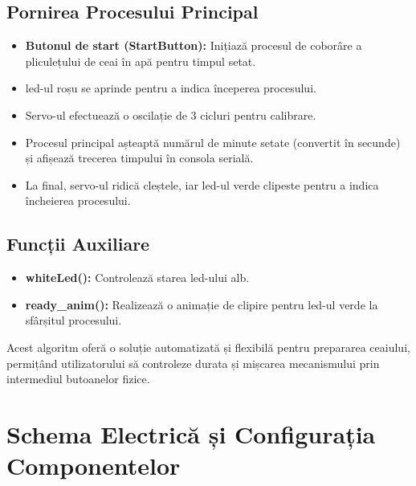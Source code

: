 \subsection{Pornirea Procesului Principal}

\begin{itemize}
    \item \textbf{Butonul de start (StartButton):} %
    Inițiază procesul de coborâre a %
    pliculețului de ceai în apă %
    pentru timpul setat.  

    \item \gls{led}-ul roșu se aprinde pentru %
    a indica începerea procesului.  

    \item Servo-ul efectuează o oscilație %
    de 3 cicluri pentru calibrare.  

    \item Procesul principal așteaptă %
    numărul de minute setate %
    (convertit în secunde) și afișează %
    trecerea timpului în consola serială.  

    \item La final, servo-ul ridică %
    cleștele, iar \gls{led}-ul verde %
    clipeste pentru a indica %
    încheierea procesului.  
\end{itemize}

\subsection{Funcții Auxiliare}

\begin{itemize}
    \item \textbf{whiteLed():} Controlează %
    starea \gls{led}-ului alb.  

    \item \textbf{ready\_anim():} Realizează %
    o animație de clipire pentru %
    \gls{led}-ul verde la sfârșitul %
    procesului.  
\end{itemize}


Acest algoritm oferă o soluție automatizată %
și flexibilă pentru prepararea ceaiului, %
permițând utilizatorului să controleze %
durata și mișcarea mecanismului prin %
intermediul butoanelor fizice.




\section{Schema Electrică și Configurația Componentelor}

